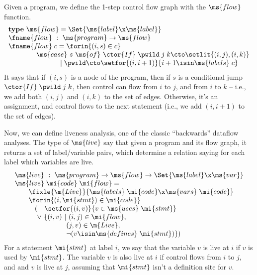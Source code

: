 Given a program, we define the 1-step control flow graph with the $\ms{flow}$
function.
\[\begin{array}{l}
\textbf{type}~\ms{flow} = \Set{\ms{label} \x \ms{label}}\\
\fname{flow} ~:~ \ms{program} \uto \ms{flow}\\
\fname{flow}\;c = \forin{(i,s) \in c}\\
\hspace{4em}\ms{case}~ s ~\ms{of}~
\ctor{If} \;\pwild \;j \;k \cto \setlit{(i,j),(i,k)}\\
\hspace{7.45em}\pipe\pwild \cto \setfor{(i,i+1)}{i+1 \isin \ms{labels}\;c}
\end{array}
\]
It says that if $(i, s)$ is a node of the program, then if $s$ is a conditional
jump $\ctor{If} \;\pwild \;j \;k$, then control can flow from $i$ to $j$, and
from $i$ to $k$ -- i.e., we add both $(i, j)$ and $(i, k)$ to the set of edges.
Otherwise, it's an assignment, and control flows to the next statement (i.e., we
add $(i, i+1)$ to the set of edges).

Now, we can define liveness analysis, one of the classic ``backwards'' dataflow
analyses. The type of $\ms{live}$ say that given a program and its flow graph,
it returns a set of label/variable pairs, which determine a relation saying
for each label which variables are live.
\[\begin{array}{l}
\ms{live} ~:~ \ms{program} \uto \ms{flow} \uto \Set{\ms{label} \x \ms{var}}\\
\ms{live} \;\mi{code} \;\mi{flow} =\\
\hspace{2em} \fixle{\m{Live}}{ %
  \ms{labels}\;\mi{code} \x \ms{vars}\;\mi{code}}\\
\hspace{2em}\forin{(i,\mi{stmt}) \in \mi{code}}\\
\hspace{2.875em} (\phantom{\vee~}\setfor{(i,v)}{v \in \ms{uses}\;\mi{stmt}}\\
\hspace{3.2em} \vee~ \{(i,v) ~|~ (i,j) \in \mi{flow},\\
\hspace{7.4em}(j,v) \in \m{Live},\\
\hspace{7.4em}\neg (v \isin \ms{defines}\; \mi{stmt})\})
\end{array}\]
For a statement $\mi{stmt}$ at label $i$, we say that the variable
$v$ is live at $i$ if $v$ is used by $\mi{stmt}$. The variable $v$
is also live at $i$ if control flows from $i$ to $j$, and and $v$
is live at $j$, assuming that $\mi{stmt}$ isn't a definition site for $v$.

